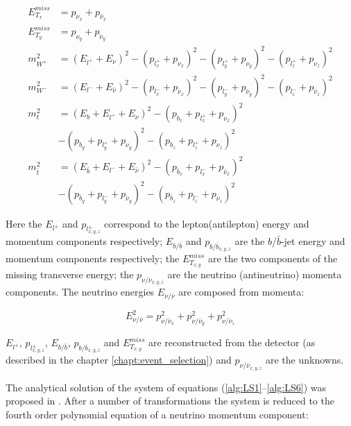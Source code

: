 \begin{align}\label{alg:LS1}
 E^{miss}_{T_{x}} & =  p_{\nu_{x}} + p_{\bar{\nu}_{x}} \\
 E^{miss}_{T_{y}} & =  p_{\nu_{y}} + p_{\bar{\nu}_{y}} \\
 m^{2}_{W^{+}} & = (E_{l^{+}} + E_{\nu})^{2} - (p_{l^{+}_{x}} + p_{\nu_{x}})^{2} - (p_{l^{+}_{y}} + p_{\nu_{y}})^{2} - (p_{l^{+}_{z}} + p_{\nu_{z}})^2 \\
 m^{2}_{W^{-}} & = (E_{l^{-}} + E_{\bar{\nu}})^{2} - (p_{l^{-}_{x}} + p_{\bar{\nu}_{x}})^{2} - (p_{l^{-}_{y}} + p_{\bar{\nu}_{y}})^{2} - (p_{l^{-}_{z}} + p_{\bar{\nu}_{z}})^2 \\
 m_{t}^{2} & = (E_{b} + E_{l^{+}} + E_{\nu})^{2} - (p_{b_{x}} + p_{l^{+}_{x}} + p_{\nu_{x}})^2 \nonumber \\
           & - (p_{b_{y}} + p_{l^{+}_{y}} + p_{\nu_{y}})^2 - (p_{b_{z}} + p_{l^{+}_{z}} + p_{\nu_{z}})^2 \\
 m_{\bar{t}}^{2} & = (E_{\bar{b}} + E_{l^{-}} + E_{\bar{\nu}})^{2} - (p_{\bar{b}_{x}} + p_{l^{-}_{x}} + p_{\bar{\nu}_{x}})^2 \nonumber \\
                 & - (p_{\bar{b}_{y}} + p_{l^{-}_{y}} + p_{\bar{\nu}_{y}})^2 - (p_{\bar{b}_{z}} + p_{l^{-}_{z}} + p_{\bar{\nu}_{z}})^2\label{alg:LS6} 
\end{align}

Here the $E_{l^{\pm}}$ and $p_{l^{\pm}_{x,y,z}}$ correspond to the lepton(antilepton) energy and momentum components respectively; 
$E_{b/\bar{b}}$ and $p_{b/\bar{b}_{x,y,z}}$ are the $b$/$\bar{b}$-jet energy and momentum components respectively; the $E^{miss}_{T_{x,y}}$ are
the two components of the missing transverse energy; the $p_{\nu/\bar{\nu}_{x,y,z}}$ are the neutrino (antineutrino) momenta components.
The neutrino energies $ E_{\nu/\bar{\nu}}$ are composed from momenta:

\begin{equation}
 E_{\nu/\bar{\nu}}^{2} = p_{\nu/\bar{\nu}_{x}}^{2} + p_{\nu/\bar{\nu}_{y}}^{2} + p_{\nu/\bar{\nu}_{z}}^{2}
\end{equation}

$E_{l^{\pm}}$, $p_{l^{\pm}_{x,y,z}}$, $E_{b/\bar{b}}$, $p_{b/\bar{b}_{x,y,z}}$ and $E^{miss}_{T_{x,y}}$ are reconstructed from the detector (as described in the chapter \ref{chapt:event_selection})
and $p_{\nu/\bar{\nu}_{x,y,z}}$ are the unknowns.

The analytical solution of the system of equations (\ref{alg:LS1}--\ref{alg:LS6}) was proposed in \cite{LSpaper}. After a number of transformations
the system is reduced to the fourth order polynomial equation of a neutrino momentum component:

